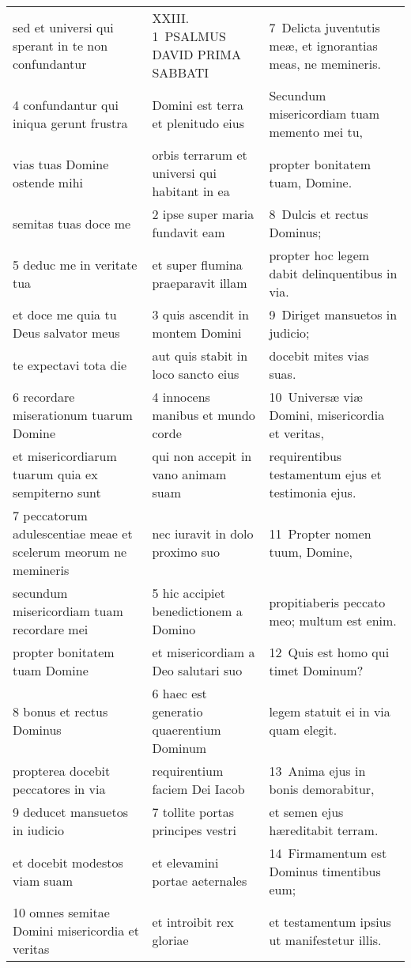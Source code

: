 \documentclass{article}
\begin{document}
\begin{longtable}{@{}p{}p{}p{}@{}}
sed et universi qui sperant in te non confundantur	&	XXIII. 1 PSALMUS DAVID PRIMA SABBATI	&	7 Delicta juventutis meæ, et ignorantias meas, ne memineris.	\\
4 confundantur qui iniqua gerunt frustra	&	Domini est terra et plenitudo eius	&	Secundum misericordiam tuam memento mei tu,	\\
vias tuas Domine ostende mihi	&	orbis terrarum et universi qui habitant in ea	&	propter bonitatem tuam, Domine.	\\
semitas tuas doce me	&	2 ipse super maria fundavit eam	&	8 Dulcis et rectus Dominus;	\\
5 deduc me in veritate tua	&	et super flumina praeparavit illam	&	propter hoc legem dabit delinquentibus in via.	\\
et doce me quia tu Deus salvator meus	&	3 quis ascendit in montem Domini	&	9 Diriget mansuetos in judicio;	\\
te expectavi tota die	&	aut quis stabit in loco sancto eius	&	docebit mites vias suas.	\\
6 recordare miserationum tuarum Domine	&	4 innocens manibus et mundo corde	&	10 Universæ viæ Domini, misericordia et veritas,	\\
et misericordiarum tuarum quia ex sempiterno sunt	&	qui non accepit in vano animam suam	&	requirentibus testamentum ejus et testimonia ejus.	\\
7 peccatorum adulescentiae meae et scelerum meorum ne memineris	&	nec iuravit in dolo proximo suo	&	11 Propter nomen tuum, Domine,	\\
secundum misericordiam tuam recordare mei	&	5 hic accipiet benedictionem a Domino	&	propitiaberis peccato meo; multum est enim.	\\
propter bonitatem tuam Domine	&	et misericordiam a Deo salutari suo	&	12 Quis est homo qui timet Dominum?	\\
8 bonus et rectus Dominus	&	6 haec est generatio quaerentium Dominum	&	legem statuit ei in via quam elegit.	\\
propterea docebit peccatores in via	&	requirentium faciem Dei Iacob	&	13 Anima ejus in bonis demorabitur,	\\
9 deducet mansuetos in iudicio	&	7 tollite portas principes vestri	&	et semen ejus hæreditabit terram.	\\
et docebit modestos viam suam	&	et elevamini portae aeternales	&	14 Firmamentum est Dominus timentibus eum;	\\
10 omnes semitae Domini misericordia et veritas	&	et introibit rex gloriae	&	et testamentum ipsius ut manifestetur illis.	\\

\end{longtable}
\end{document}
